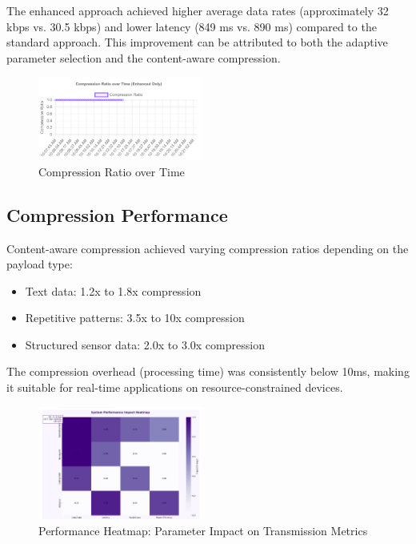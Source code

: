 \documentclass[conference]{IEEEtran}
\begin{document}
The enhanced approach achieved higher average data rates (approximately 32 kbps vs. 30.5 kbps) and lower latency (849 ms vs. 890 ms) compared to the standard approach. This improvement can be attributed to both the adaptive parameter selection and the content-aware compression.

\begin{figure}[htbp]
\centering
\includegraphics[width=0.48\textwidth]{images/compression-ratio-over-time.png}
\caption{Compression Ratio over Time}
\label{fig:compression_time_ratio}
\end{figure}

\subsection{Compression Performance}
Content-aware compression achieved varying compression ratios depending on the payload type:
\begin{itemize}
    \item Text data: 1.2x to 1.8x compression
    \item Repetitive patterns: 3.5x to 10x compression
    \item Structured sensor data: 2.0x to 3.0x compression
\end{itemize}

The compression overhead (processing time) was consistently below 10ms, making it suitable for real-time applications on resource-constrained devices.

\begin{figure}[htbp]
\centering
\includegraphics[width=0.48\textwidth]{images/performance-heatmap.png}
\caption{Performance Heatmap: Parameter Impact on Transmission Metrics}
\label{fig:performance_heatmap}
\end{figure}
\end{document}
